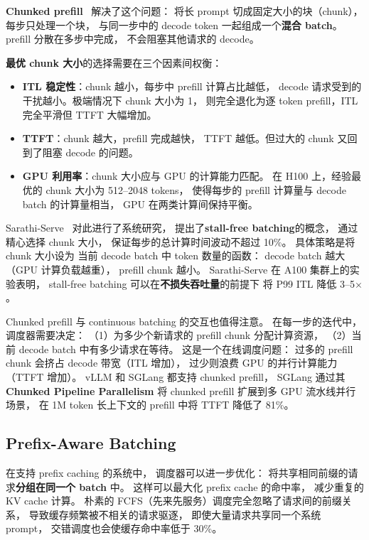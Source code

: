 \textbf{Chunked prefill}~\cite{agrawal2024sarathi} 解决了这个问题：
将长 prompt 切成固定大小的块（chunk），
每步只处理一个块，
与同一步中的 decode token 一起组成一个\textbf{混合 batch}。
prefill 分散在多步中完成，
不会阻塞其他请求的 decode。

\textbf{最优 chunk 大小}的选择需要在三个因素间权衡：
\begin{itemize}[noitemsep]
  \item \textbf{ITL 稳定性}：chunk 越小，每步中 prefill 计算占比越低，
        decode 请求受到的干扰越小。极端情况下 chunk 大小为 1，
        则完全退化为逐 token prefill，ITL 完全平滑但 TTFT 大幅增加。
  \item \textbf{TTFT}：chunk 越大，prefill 完成越快，
        TTFT 越低。但过大的 chunk 又回到了阻塞 decode 的问题。
  \item \textbf{GPU 利用率}：chunk 大小应与 GPU 的计算能力匹配。
        在 H100 上，经验最优的 chunk 大小为 512--2048 tokens，
        使得每步的 prefill 计算量与 decode batch 的计算量相当，
        GPU 在两类计算间保持平衡。
\end{itemize}

Sarathi-Serve~\cite{agrawal2024sarathi} 对此进行了系统研究，
提出了\textbf{stall-free batching}的概念，
通过精心选择 chunk 大小，
保证每步的总计算时间波动不超过 10\%。
具体策略是将 chunk 大小设为
当前 decode batch 中 token 数量的函数：
decode batch 越大（GPU 计算负载越重），
prefill chunk 越小。
Sarathi-Serve 在 A100 集群上的实验表明，
stall-free batching 可以在\textbf{不损失吞吐量}的前提下
将 P99 ITL 降低 3--5$\times$。

Chunked prefill 与 continuous batching 的交互也值得注意。
在每一步的迭代中，调度器需要决定：
（1）为多少个新请求的 prefill chunk 分配计算资源，
（2）当前 decode batch 中有多少请求在等待。
这是一个在线调度问题：
过多的 prefill chunk 会挤占 decode 带宽（ITL 增加），
过少则浪费 GPU 的并行计算能力（TTFT 增加）。
vLLM 和 SGLang 都支持 chunked prefill，
SGLang 通过其 \textbf{Chunked Pipeline Parallelism}
将 chunked prefill 扩展到多 GPU 流水线并行场景，
在 1M token 长上下文的 prefill 中将 TTFT 降低了 81\%。

\subsection{Prefix-Aware Batching}

在支持 prefix caching 的系统中，
调度器可以进一步优化：
将共享相同前缀的请求\textbf{分组在同一个 batch} 中。
这样可以最大化 prefix cache 的命中率，
减少重复的 KV cache 计算。
朴素的 FCFS（先来先服务）调度完全忽略了请求间的前缀关系，
导致缓存频繁被不相关的请求驱逐，
即使大量请求共享同一个系统 prompt，
交错调度也会使缓存命中率低于 30\%。

